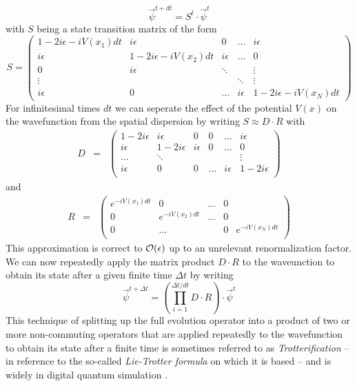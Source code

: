 %
\begin{equation}
\vec{\psi}^{t+dt} = S^t  \cdot \vec{\psi}^t
\end{equation}
%
with $S$ being a state transition matrix of the form
%
\begin{equation}
S = \left(
	\begin{array}{ccccc}
		1-2i\epsilon-iV(x_1)dt & i\epsilon & 0 & \hdots &  i\epsilon \\
		i \epsilon & 1-2i\epsilon -iV(x_2)dt & i\epsilon & \hdots & 0 \\
		0 & i\epsilon & \ddots & & \vdots \\
		\vdots & & & \ddots  & \vdots \\
		i \epsilon & 0 & \hdots & i\epsilon & 1 - 2i\epsilon -iV(x_N)dt
	\end{array}
 \right) \label{eq:grover_iteration_matrix}
\end{equation}
%
For infinitesimal times $dt$ we can seperate the effect of the potential $V(x)$ on the wavefunction from the spatial dispersion by writing $S \approx D\cdot R$ with 
%
\begin{eqnarray}
D & = & \left( 
		\begin{array}{cccccc}
		1-2i \epsilon & i\epsilon & 0 & 0 & \hdots & i\epsilon \\
		i \epsilon & 1 - 2i \epsilon & i \epsilon & 0 & \hdots & 0 \\
		\hdots & \ddots & & & & \vdots \\
		i \epsilon & 0 & 0 &  \hdots & i\epsilon & 1-2i \epsilon \\
		\end{array}
	\right)
\end{eqnarray}
%
and 
%
\begin{eqnarray}
R & = & \left( \begin{array}{ccccc}
	e^{-i V(x_1) dt} & 0 & \hdots & 0 \\
	0 & e^{-i V (x_2) dt} & \hdots & 0 \\
	0 & \hdots & & 0 & e^{-i V (x_N) dt} \\
	\end{array}
	\right)
\end{eqnarray}
%
This approximation is correct to $\begin{mathcal}O\end{mathcal}(\epsilon)$ up to an unrelevant renormalization factor. We can now repeatedly apply the matrix product $D\cdot R$ to the waveunction to obtain its state after a given finite time $\Delta t$ by writing
%
\begin{equation}
\vec{\psi}^{t+\Delta t} = \left(\prod\limits_{i = 1}^{\Delta t/dt} D\cdot R\right)\cdot \vec{\psi}^{t} \label{eq:trotter_evolution}
\end{equation}
%
This technique of splitting up the full evolution operator into a product of two or more non-commuting operators that are applied repeatedly to the wavefunction to obtain its state after a finite time is sometimes referred to as {\it Trotterification} -- in reference to the so-called {\it Lie-Trotter formula} on which it is based -- and is widely in digital quantum simulation \citep{lloyd_universal_1996,lanyon_universal_2011}.

